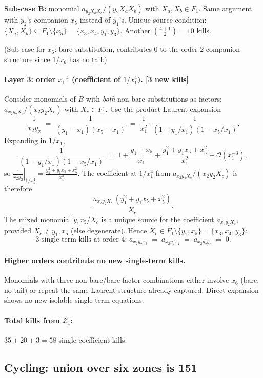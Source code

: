 \documentclass[11pt]{article}
\newcommand{\Zr}{\mathcal{Z}}
\newcommand{\Fr}{F}
\begin{document}
\smallskip
\noindent\textbf{Sub-case B:} monomial
$a_{y_2 X_a X_b}/(y_2 X_a X_b)$ with $X_a, X_b \in \Fr_1$. Same
argument with $y_2$'s companion $x_5$ instead of $y_1$'s. Unique-source
condition: $\{X_a, X_b\} \subseteq \Fr_1 \setminus \{x_5\} = \{x_3, x_4, y_1, y_3\}$.
Another $\binom{4+1}{2} = 10$ kills.

\smallskip
(Sub-case for $x_6$: bare substitution, contributes $0$ to the order-$2$
companion structure since $1/x_6$ has no tail.)

\paragraph{Layer 3: order $x_1^{-4}$ (coefficient of $1/x_1^4$). [3 new kills]}
Consider monomials of $B$ with \emph{both} non-bare substitutions as
factors: $a_{x_2 y_2 X_c}/(x_2 y_2 X_c)$ with $X_c \in \Fr_1$. Use the
product Laurent expansion
\[
\frac{1}{x_2 y_2}
\;=\; \frac{1}{(y_1 - x_1)(x_5 - x_1)}
\;=\; \frac{1}{x_1^2}\cdot\frac{1}{(1 - y_1/x_1)(1 - x_5/x_1)}.
\]
Expanding in $1/x_1$,
\[
\frac{1}{(1 - y_1/x_1)(1 - x_5/x_1)}
\;=\; 1 + \frac{y_1 + x_5}{x_1} + \frac{y_1^2 + y_1 x_5 + x_5^2}{x_1^2}
   + \mathcal{O}(x_1^{-3}),
\]
so $\displaystyle \left.\frac{1}{x_2 y_2}\right|_{1/x_1^4}
= \frac{y_1^2 + y_1 x_5 + x_5^2}{x_1^4}$. The coefficient at
$1/x_1^4$ from $a_{x_2 y_2 X_c}/(x_2 y_2 X_c)$ is therefore
\[
\frac{a_{x_2 y_2 X_c}\, (y_1^2 + y_1 x_5 + x_5^2)}{X_c}.
\]
The mixed monomial $y_1 x_5 / X_c$ is a unique source for the
coefficient $a_{x_2 y_2 X_c}$, provided $X_c \ne y_1, x_5$ (else
degenerate). Hence $X_c \in \Fr_1 \setminus \{y_1, x_5\} = \{x_3, x_4, y_3\}$:
\[
\boxed{\text{$3$ single-term kills at order $4$: }
a_{x_2 y_2 x_3} \;=\; a_{x_2 y_2 x_4} \;=\; a_{x_2 y_2 y_3} \;=\; 0.}
\]

\paragraph{Higher orders contribute no new single-term kills.}
Monomials with three non-bare/bare-factor combinations either involve
$x_6$ (bare, no tail) or repeat the same Laurent structure already
captured. Direct expansion shows no new isolable single-term equations.

\paragraph{Total kills from $\Zr_1$:}
$35 + 20 + 3 = 58$ single-coefficient kills.

\subsection{Cycling: union over six zones is 151}
\end{document}
